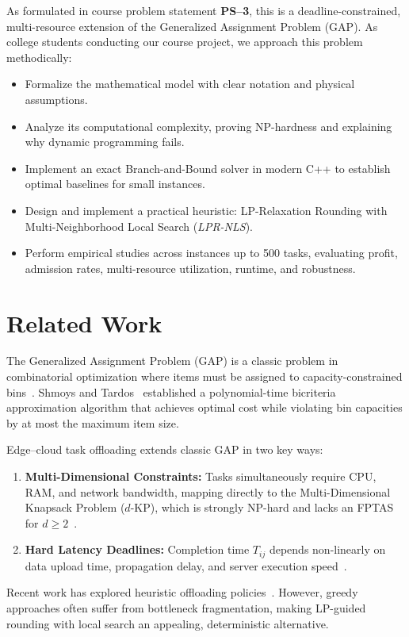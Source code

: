 \documentclass[conference,10pt]{IEEEtran}
\begin{document}
As formulated in course problem statement \textbf{PS--3}, this is a deadline-constrained, multi-resource extension of the Generalized Assignment Problem (GAP). As college students conducting our course project, we approach this problem methodically:
\begin{itemize}
    \item Formalize the mathematical model with clear notation and physical assumptions.
    \item Analyze its computational complexity, proving NP-hardness and explaining why dynamic programming fails.
    \item Implement an exact Branch-and-Bound solver in modern C++ to establish optimal baselines for small instances.
    \item Design and implement a practical heuristic: LP-Relaxation Rounding with Multi-Neighborhood Local Search (\textit{LPR-NLS}).
    \item Perform empirical studies across instances up to 500 tasks, evaluating profit, admission rates, multi-resource utilization, runtime, and robustness.
\end{itemize}

\section{Related Work}
The Generalized Assignment Problem (GAP) is a classic problem in combinatorial optimization where items must be assigned to capacity-constrained bins~\cite{shmoys1993approximation}. Shmoys and Tardos~\cite{shmoys1993approximation} established a polynomial-time bicriteria approximation algorithm that achieves optimal cost while violating bin capacities by at most the maximum item size.

Edge--cloud task offloading extends classic GAP in two key ways:
\begin{enumerate}
    \item \textbf{Multi-Dimensional Constraints:} Tasks simultaneously require CPU, RAM, and network bandwidth, mapping directly to the Multi-Dimensional Knapsack Problem ($d$-KP), which is strongly NP-hard and lacks an FPTAS for $d \ge 2$~\cite{garey1979computers}.
    \item \textbf{Hard Latency Deadlines:} Completion time $T_{ij}$ depends non-linearly on data upload time, propagation delay, and server execution speed~\cite{gao2022deadline}.
\end{enumerate}

Recent work has explored heuristic offloading policies~\cite{chen2024genetic, asghar2022survey}. However, greedy approaches often suffer from bottleneck fragmentation, making LP-guided rounding with local search an appealing, deterministic alternative.
\end{document}
